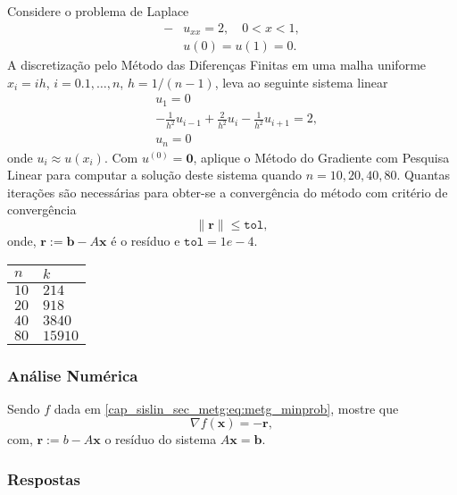 \begin{exer}
  Considere o problema de Laplace
  \begin{align}
    -&u_{xx} = 2,\quad 0 < x < 1,\\
     &u(0) = u(1) = 0.
  \end{align}
  A discretização pelo Método das Diferenças Finitas em uma malha uniforme $x_i = ih$, $i=0.1,\dotsc,n$, $h=1/(n-1)$, leva ao seguinte sistema linear
  \begin{align}
    &u_1 = 0\\
    &-\frac{1}{h^2}u_{i-1} + \frac{2}{h^2}u_{i} - \frac{1}{h^2}u_{i+1} = 2,\\
    &u_n = 0
  \end{align}
  onde $u_i \approx u(x_i)$. Com $u^{(0)} = \pmb{0}$, aplique o Método do Gradiente com Pesquisa Linear para computar a solução deste sistema quando $n=10, 20, 40, 80$. Quantas iterações são necessárias para obter-se a convergência do método com critério de convergência
  \begin{equation}
    \|\pmb{r}\| \leq \texttt{tol},
  \end{equation}
  onde, $\pmb{r} := \pmb{b} - A\pmb{x}$ é o resíduo e $\texttt{tol} = 1e-4$.
\end{exer}
\begin{resp}
  \begin{tabular}{ll}
    $n$ & $k$\\\hline
    $10$ & $214$\\
    $20$ & $918$\\
    $40$ & $3840$\\
    $80$ & $15910$
  \end{tabular}
\end{resp}

\subsubsection{Análise Numérica}

\begin{exer}
  Sendo $f$ dada em \eqref{cap_sislin_sec_metg:eq:metg_minprob}, mostre que
  \begin{equation}
    \nabla f\left(\pmb{x}\right) = -\pmb{r},
  \end{equation}
  com, $\pmb{r} := b - A\pmb{x}$ o resíduo do sistema $A\pmb{x} = \pmb{b}$.
\end{exer}

\ifisbook
\subsubsection{Respostas}
\shipoutAnswer
\fi

